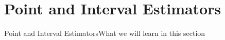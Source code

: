 \section{Point and Interval Estimators}

\begin{frame}{Point and Interval Estimators}{What we will learn in this section}
    
\end{frame}